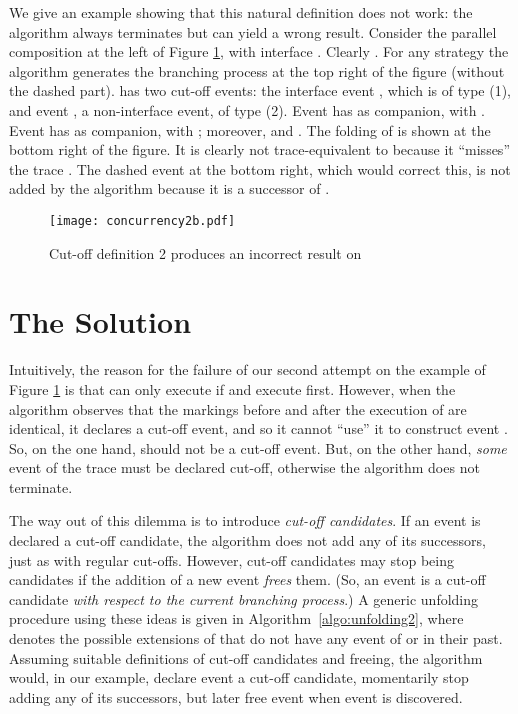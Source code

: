 \documentclass{llncs}
\begin{document}
We give 
an example showing that this natural definition does not work: the algorithm always terminates
but can yield a wrong result. Consider the parallel composition at the left of
Figure \ref{fig:concneeded}, with interface . Clearly
. For any strategy the algorithm generates the branching 
process  at the top right of the figure (without the dashed part).  has two cut-off events: the interface event ,
which is of type (1), and event , a non-interface event, of type (2). Event  has  as companion,
with . Event  has  as companion, with ;
moreover,  and . The folding of  
is shown at the bottom right of the figure.
It is clearly not trace-equivalent to  because it ``misses'' the trace 
. The dashed event at the bottom right, which would correct this,
is not added by the algorithm because it is a successor of . 

\begin{figure}[htbp]
\centering
\texttt{[image: concurrency2b.pdf]}
\caption{Cut-off definition 2 produces an incorrect result on }\label{fig:needconc}
\label{fig:concneeded}
\end{figure}


\section{The Solution}

Intuitively, the reason for the failure of our second attempt
on the example of Figure \ref{fig:concneeded} is that  can only execute  if  and  
execute  first. However, when the algorithm observes that the markings before and after 
the execution of  are identical, it declares  a cut-off event, and so it cannot ``use'' it to construct event .
So, on the one hand,  should not be a cut-off event. But, on the other hand, {\em some} event of the trace 
 must be declared cut-off, otherwise the algorithm does not terminate. 

The way out of this dilemma is to introduce {\em cut-off candidates}.
If an event is declared a cut-off candidate, the algorithm does not add any of its 
successors, just as with regular cut-offs. However, cut-off candidates may stop being candidates if the addition of a new event {\em frees} them. 
(So, an event is a cut-off candidate {\em with respect to the current branching process}.) A generic unfolding procedure using these ideas is given in Algorithm~\ref{algo:unfolding2}, where 
 denotes the possible extensions of  that do not have any 
event of  or  in their past.
Assuming suitable definitions of cut-off candidates and freeing, the algorithm
would, in our example, declare event  a cut-off candidate, momentarily stop adding any of its successors, but later free event  when event  is discovered.
\end{document}
